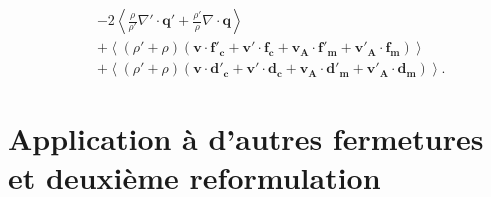 \begin{equation}
{\begin{array}{lcl}
&&-2\left<\frac{\rho}{\rho'}  \nabla' \cdot \boldsymbol{q'} + \frac{\rho'}{\rho}  \nabla \cdot \boldsymbol{q}  \right> \\
&&+  \left<\left(\rho' + \rho\right)\left(\boldsymbol{v} \cdot \boldsymbol{f'_c} + \boldsymbol{v'} \cdot \boldsymbol{f_c} + \boldsymbol{v_A} \cdot \boldsymbol{f'_m} + \boldsymbol{v'_A} \cdot \boldsymbol{f_m}\right) \right>\\
&&+ \left<\left(\rho' + \rho\right)\left(\boldsymbol{v} \cdot \boldsymbol{d'_c} + \boldsymbol{v'} \cdot \boldsymbol{d_c}+\boldsymbol{v_A} \cdot \boldsymbol{d'_m} + \boldsymbol{v'_A} \cdot \boldsymbol{d_m}\right)\right> .
\end{array}}
\end{equation}

\section{Application à d'autres fermetures et deuxième reformulation}
\label{sec-133}

